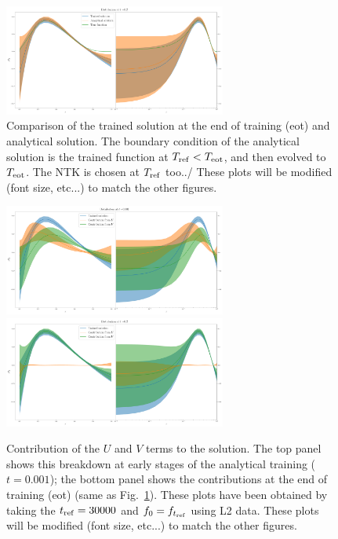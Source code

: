 \begin{figure}[t!]
  \centering
  \includegraphics[width=0.65\textwidth]{plots/xT3_2.png}
  \caption{Comparison of the trained solution at the end of training (eot) and analytical solution.
  The boundary condition of the analytical solution is the trained function at $T_{\rm ref} < T_{\rm eot}$,
  and then evolved to $T_{\rm eot}$. The NTK is chosen at $T_{\rm ref}$ too../
  \ac{These plots will be modified (font size, etc...) to match the other figures.}}
  \label{fig:xT3_analytical}
\end{figure}

\begin{figure}[t!]
  \centering
  \includegraphics[width=0.65\textwidth]{plots/xT3_u_v_contribution_small_t.pdf} \\
  \includegraphics[width=0.65\textwidth]{plots/xT3_u_v_contribution_eot.pdf}
  \caption{Contribution of the $U$ and $V$ terms to the solution. The top panel shows this breakdown
  at early stages of the analytical training ($t=0.001$); the bottom panel shows the contributions at the end
  of training (eot) (same as Fig.~\ref{fig:xT3_analytical}). These plots have been obtained by taking the $t_{\rm ref} = 30000$
  and $f_0 = f_{t_{\rm ref}}$ using L2 data.
  \ac{These plots will be modified (font size, etc...) to match the other figures.}}
\end{figure}

